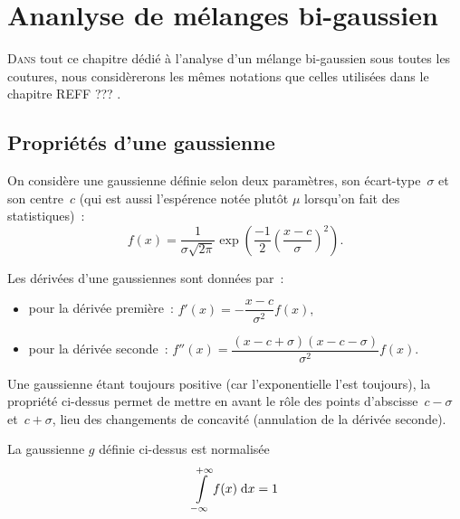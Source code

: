 \documentclass[main.tex]{subfiles}
\begin{document}
\chapter{Ananlyse de mélanges bi-gaussien}
\lettrine[lines=2, lhang=0.33, loversize=0.25]{D}{ans} tout ce chapitre dédié à l'analyse d'un mélange bi-gaussien sous toutes les coutures, nous considèrerons les mêmes notations que celles utilisées dans le chapitre REFF ??? .

\section{Propriétés d'une gaussienne}
On considère une gaussienne définie selon deux paramètres, son écart-type~$\sigma$ et son centre~$c$ (qui est aussi l'espérence notée plutôt $\mu$ lorsqu'on fait des statistiques)~:
\begin{equation}
\label{eq:anxe_gaussienne}
f(x)=\dfrac{1}{\sigma \sqrt{2\pi}} \exp\left( \frac{-1}{2}  \left(  \dfrac{x-c}{\sigma} \right)^2  \right).
\end{equation}

\begin{prop}
Les dérivées d'une gaussiennes sont données par~:
\begin{itemize}
\item pour la dérivée première~: $f'(x)= -\dfrac{x-c}{\sigma^2}f(x), $
\item pour la dérivée seconde~: $f''(x)= \dfrac{(x-c+\sigma)(x-c-\sigma)}{\sigma^2}f(x). $
\end{itemize}
\end{prop}

Une gaussienne étant toujours positive (car l'exponentielle l'est toujours), la propriété ci-dessus permet de mettre en avant le rôle des points d'abscisse~$c-\sigma$ et~$c+\sigma$, lieu des changements de concavité (annulation de la dérivée seconde).

\begin{prop}
\label{prop:integ1}
La gaussienne $g$ définie ci-dessus est normalisée \ie
\begin{equation}
\label{eq:anxe_integ_gauss}
\int\limits_{-\infty}^{+\infty} f(x) \;{\rm d}x = 1
\end{equation}
\end{prop}
\end{document}
